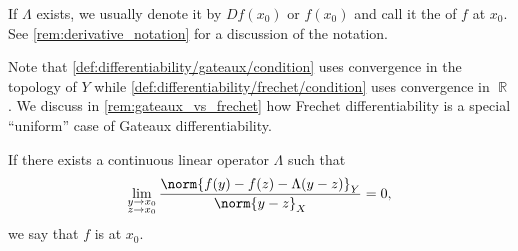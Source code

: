 \begin{definition}
\begin{thmenum}
    If \( \Lambda \) exists, we usually denote it by \( D f(x_0) \) or \( f(x_0) \) and call it the  of \( f \) at \( x_0 \). See \cref{rem:derivative_notation} for a discussion of the notation.

    Note that \cref{def:differentiability/gateaux/condition} uses convergence in the topology of \( Y \) while \cref{def:differentiability/frechet/condition} uses convergence in \( \BbbR \). We discuss in \cref{rem:gateaux_vs_frechet} how Frechet differentiability is a special \enquote{uniform} case of Gateaux differentiability.

    If there exists a continuous linear operator \( \Lambda \) such that
    \begin{equation}\label{def:differentiability/strict/condition}
      \lim_{\substack{y \to x_0 \\ z \to x_0}} \frac {\norm{f(y) - f(z) - \Lambda (y - z)}_Y} {\norm{y - z}_X} = 0,
    \end{equation}
    we say that \( f \) is  at \( x_0 \).
  \end{thmenum}
\end{definition}

